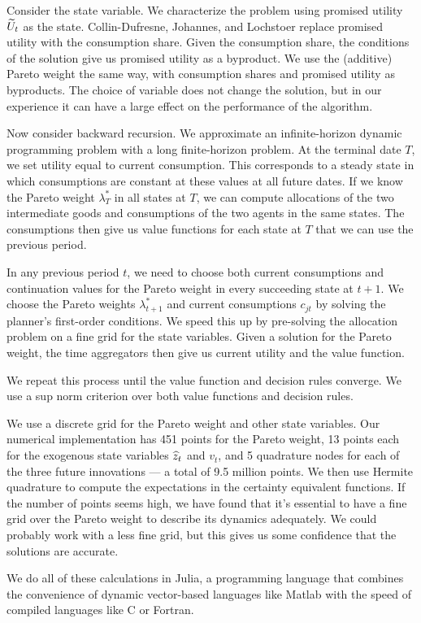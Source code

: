 Consider the state variable.  We characterize the problem using promised utility $\widetilde{U}_t$ as the state.
Collin-Dufresne, Johannes, and Lochstoer replace promised utility with the consumption share.
Given the consumption share, the conditions of the solution give us promised utility as a byproduct.
We use the (additive) Pareto weight the same way,
with consumption shares and promised utility as byproducts.
The choice of variable does not change the solution,
but in our experience it can have a large effect on the performance of the algorithm.

Now consider backward recursion.
We approximate an infinite-horizon dynamic programming problem
with a long finite-horizon problem.
At the terminal date $T$, we set utility equal to current consumption.
This corresponds to a steady state in which consumptions are constant at these values
at all future dates.
If we know the Pareto weight $\lambda_T^*$ in all states at $T$,
we can compute allocations of the two intermediate goods and consumptions of the two agents
in the same states.
The consumptions then give us value functions for each state at $T$ that we can use the
previous period.

In any previous period $t$, we need to choose both current consumptions
and continuation values for the Pareto weight in every succeeding state at $t+1$.
We choose the Pareto weights $\lambda^*_{t+1}$ and current consumptions $c_{jt}$
by solving the planner's first-order conditions.
We speed this up by pre-solving the allocation problem on a fine grid for the state variables.
Given a solution for the Pareto weight, the time aggregators then give us current utility
and the value function.

We repeat this process until the value function and decision rules converge.
We use a sup norm criterion over both value functions and decision rules.


We use a discrete grid for the Pareto weight and other state variables.
Our numerical implementation has 451 points for the Pareto weight,
13 points each for the exogenous state variables $\widehat{z}_t$ and $v_t$,
and 5 quadrature nodes for each of the three future innovations ---
a total of 9.5 million points.
We then use Hermite quadrature to compute the expectations in the certainty equivalent functions.
If the number of points seems high, we have found that it's essential to have a fine grid
over the Pareto weight to describe its dynamics adequately.
We could probably work with a less fine grid,
but this gives us some confidence that the solutions are accurate.

We do all of these calculations in Julia,
a programming language that combines the convenience of
dynamic vector-based languages like Matlab with the speed of compiled languages like C or Fortran.
